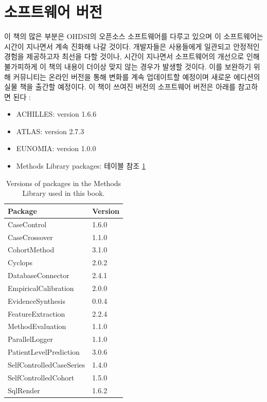 \documentclass[10.5pt]{book}
\providecommand{\tightlist}{%
  \setlength{\itemsep}{0pt}\setlength{\parskip}{0pt}}
\theoremstyle{definition}
\theoremstyle{definition}
\theoremstyle{definition}
\theoremstyle{remark}
\begin{document}
\section*{소프트웨어 버전}\label{-}

이 책의 많은 부분은 OHDSI의 오픈소스 소프트웨어를 다루고 있으며 이
소프트웨어는 시간이 지나면서 계속 진화해 나갈 것이다. 개발자들은
사용들에게 일관되고 안정적인 경험을 제공하고자 최선을 다할 것이나,
시간이 지나면서 소프트웨어의 개선으로 인해 불가피하게 이 책의 내용이
더이상 맞지 않는 경우가 발생할 것이다. 이를 보완하기 위해 커뮤니티는
온라인 버전을 통해 변화를 계속 업데이트할 예정이며 새로운 에디션의 실물
책을 출간할 예정이다. 이 책이 쓰여진 버전의 소프트웨어 버전은 아래를
참고하면 된다 :

\begin{itemize}
\tightlist
\item
  ACHILLES: version 1.6.6
\item
  ATLAS: version 2.7.3
\item
  EUNOMIA: version 1.0.0
\item
  Methods Library packages: 테이블 참조 \ref{tab:packageVersions}
\end{itemize}

\begin{table}[t]

\caption{\label{tab:packageVersions}Versions of packages in the Methods Library used in this book.}
\centering
\begin{tabular}{ll}
\toprule
Package & Version\\
\midrule
CaseControl & 1.6.0\\
CaseCrossover & 1.1.0\\
CohortMethod & 3.1.0\\
Cyclops & 2.0.2\\
DatabaseConnector & 2.4.1\\
\addlinespace
EmpiricalCalibration & 2.0.0\\
EvidenceSynthesis & 0.0.4\\
FeatureExtraction & 2.2.4\\
MethodEvaluation & 1.1.0\\
ParallelLogger & 1.1.0\\
\addlinespace
PatientLevelPrediction & 3.0.6\\
SelfControlledCaseSeries & 1.4.0\\
SelfControlledCohort & 1.5.0\\
SqlRender & 1.6.2\\
\bottomrule
\end{tabular}
\end{table}
\end{document}

